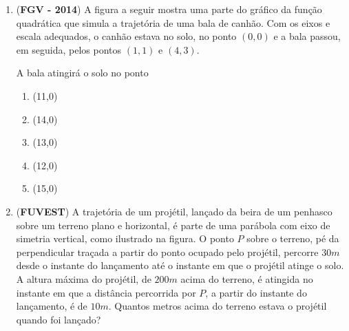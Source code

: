 \begin{enumerate}
\needspace{10em}
\item (\textbf{FGV - 2014}) A figura a seguir mostra uma parte do gráfico da função quadrática que simula a trajetória de uma bala de canhão. Com os eixos e escala adequados, o canhão estava no solo, no ponto \((0,0)\) e a bala passou, em seguida, pelos pontos \((1,1)\) e \((4,3)\).
\begin{center}\end{center}
A bala atingirá o solo no ponto
\begin{enumerate}
\item (11,0)
\item (14,0)
\item (13,0)
\item (12,0)
\item (15,0)
\end{enumerate}

\item (\textbf{FUVEST}) A trajetória de um projétil, lançado da beira de um penhasco sobre um terreno plano e horizontal, é parte de uma parábola com eixo de simetria vertical, como ilustrado na figura. O ponto \(P\) sobre o terreno, pé da perpendicular traçada a partir do ponto ocupado pelo projétil, percorre \(30m\) desde o instante do lançamento até o instante em que o projétil atinge o solo. A altura máxima do projétil, de \(200m\) acima do terreno, é atingida no instante
em que a distância percorrida por \(P\), a partir do instante do lançamento, é de \(10m\). Quantos metros acima do terreno estava o projétil quando foi lançado?

\begin{figure}[H]
\centering
\capstart


\end{figure}
\end{enumerate}
